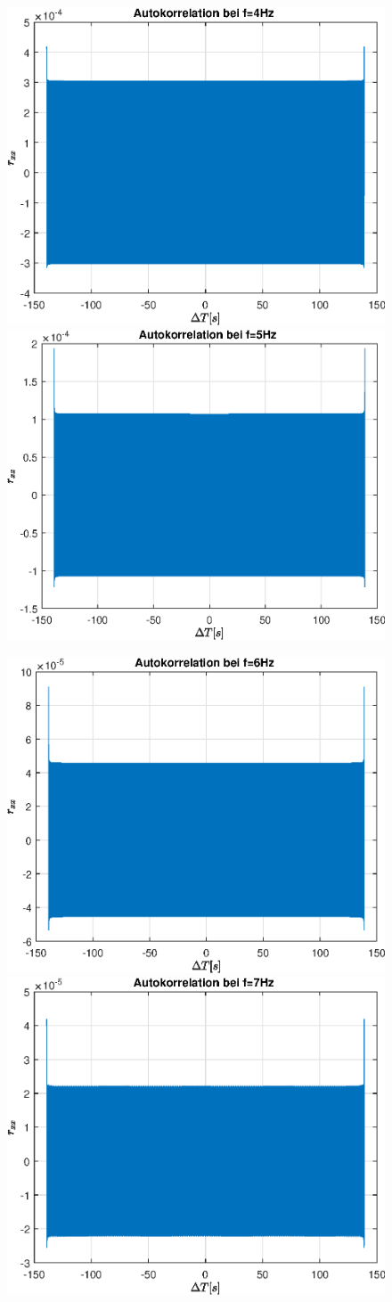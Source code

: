 \documentclass{article}
\begin{document}
\begin{figure}[!h]
\includegraphics[width=0.5\linewidth]{img/sim_rxx_sine_freq_4}
\includegraphics[width=0.5\linewidth]{img/sim_rxx_sine_freq_5}
\end{figure}
\begin{figure}[!h]
\includegraphics[width=0.5\linewidth]{img/sim_rxx_sine_freq_6}
\includegraphics[width=0.5\linewidth]{img/sim_rxx_sine_freq_7}
\end{figure}
\end{document}
